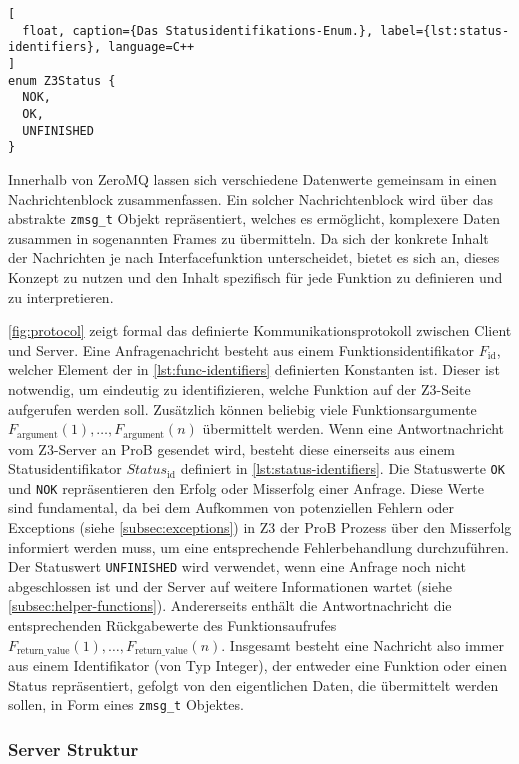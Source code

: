 \begin{lstlisting}[
  float, caption={Das Statusidentifikations-Enum.}, label={lst:status-identifiers}, language=C++
]
enum Z3Status {
  NOK,
  OK,
  UNFINISHED
}
\end{lstlisting}


Innerhalb von ZeroMQ lassen sich verschiedene Datenwerte gemeinsam in einen Nachrichtenblock zusammenfassen.
Ein solcher Nachrichtenblock wird über das abstrakte \texttt{zmsg\_t} Objekt repräsentiert, welches es ermöglicht,
komplexere Daten zusammen in sogenannten Frames zu übermitteln.
Da sich der konkrete Inhalt der Nachrichten je nach Interfacefunktion unterscheidet,
bietet es sich an, dieses Konzept zu nutzen und den Inhalt spezifisch für jede Funktion zu definieren und zu interpretieren.

\cref{fig:protocol} zeigt formal das definierte Kommunikationsprotokoll zwischen Client und Server.
Eine Anfragenachricht besteht aus einem Funktionsidentifikator $F_\text{id}$, welcher Element der in \cref{lst:func-identifiers} definierten Konstanten ist.
Dieser ist notwendig, um eindeutig zu identifizieren, welche Funktion auf der Z3-Seite aufgerufen werden soll.
Zusätzlich können beliebig viele Funktionsargumente $F_\text{argument}(1), \ldots, F_\text{argument}(n)$ übermittelt werden.
Wenn eine Antwortnachricht vom Z3-Server an ProB gesendet wird, besteht diese einerseits aus einem Statusidentifikator $Status_\text{id}$ definiert in \cref{lst:status-identifiers}.
Die Statuswerte \texttt{OK} und \texttt{NOK} repräsentieren den Erfolg oder Misserfolg einer Anfrage.
Diese Werte sind fundamental, da bei dem Aufkommen von potenziellen Fehlern oder Exceptions (siehe \cref{subsec:exceptions}) in Z3 der ProB Prozess über den Misserfolg informiert werden muss,
um eine entsprechende Fehlerbehandlung durchzuführen.
Der Statuswert \texttt{UNFINISHED} wird verwendet, wenn eine Anfrage noch nicht abgeschlossen ist und der Server auf weitere Informationen wartet (siehe \cref{subsec:helper-functions}).
Andererseits enthält die Antwortnachricht die entsprechenden Rückgabewerte des Funktionsaufrufes $F_\text{return\_value}(1), \ldots, F_\text{return\_value}(n)$.
Insgesamt besteht eine Nachricht also immer aus einem Identifikator (von Typ Integer), der entweder eine Funktion oder einen Status repräsentiert,
gefolgt von den eigentlichen Daten, die übermittelt werden sollen, in Form eines \texttt{zmsg\_t} Objektes.

\subsubsection{Server Struktur}

